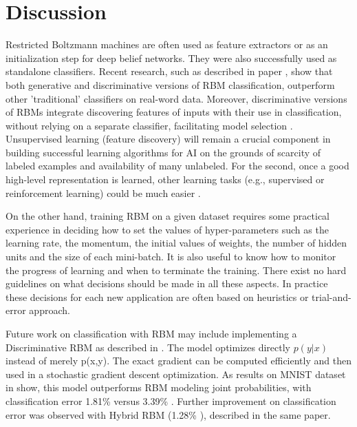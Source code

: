 \documentclass[a4paper]{scrartcl}
\begin{document}
\section{Discussion}
Restricted Boltzmann machines are often used as feature extractors or as an initialization step for deep belief networks. They were also successfully used as standalone classifiers. Recent research, such as described in paper \cite{Schmah}, show that both generative and discriminative versions of RBM classification, outperform other 'traditional' classifiers on real-word data. Moreover, discriminative versions of RBMs integrate discovering features of inputs with their use in classification, without relying on a separate classifier, facilitating model selection \cite{Larochelle}. Unsupervised learning (feature discovery) will remain a crucial component in building successful learning algorithms for AI on the grounds of scarcity of labeled examples and availability of many unlabeled. For the second, once a good high-level representation is learned, other learning tasks (e.g., supervised or reinforcement learning) could be much easier \cite{Bengio}.
\par On the other hand, training RBM on a given dataset requires some practical experience in deciding how to set the values of hyper-parameters such as the learning rate, the momentum, the initial values of weights, the number of hidden units and the size of each mini-batch. It is also useful to know how to monitor the progress of learning and when to terminate the training. There exist no hard guidelines on what decisions should be made in all these aspects. In practice these decisions for each new application are often based on heuristics or trial-and-error approach.  
\par Future work on classification with RBM may include implementing a Discriminative RBM as described in \cite{Larochelle}. The model optimizes directly $p(y \vert x)$ instead of merely p(x,y). The exact gradient can be computed efficiently and then used in a stochastic gradient descent optimization. As results on MNIST dataset in \cite{Larochelle} show, this model outperforms RBM modeling joint probabilities, with classification error 1.81\% versus 3.39\% . Further improvement on classification error was observed with Hybrid RBM (1.28\% ), described in the same paper.
\end{document}
